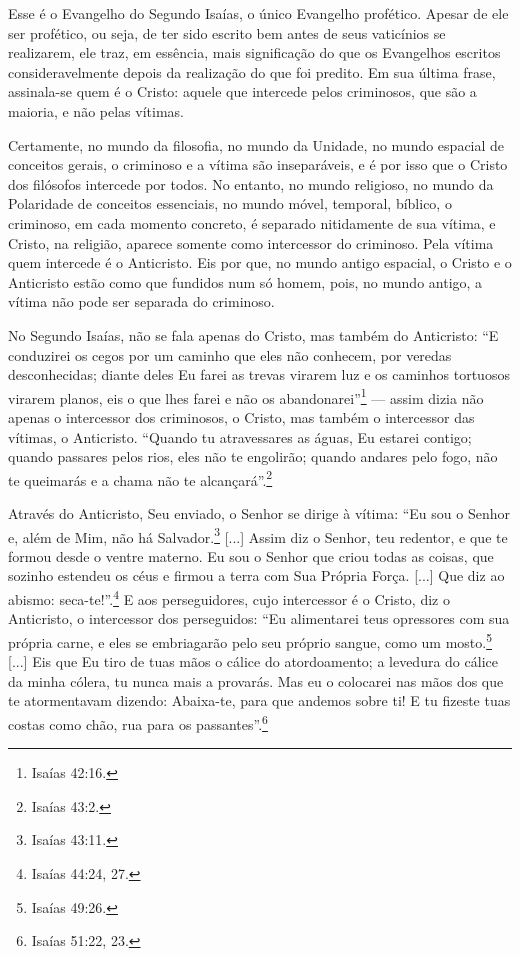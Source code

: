Esse é o Evangelho do Segundo Isaías, o único Evangelho profético.
Apesar de ele ser profético, ou seja, de ter sido escrito bem antes de
seus vaticínios se realizarem, ele traz, em essência, mais significação
do que os Evangelhos escritos consideravelmente depois da realização do
que foi predito. Em sua última frase, assinala-se quem é o Cristo:
aquele que intercede pelos criminosos, que são a maioria, e não pelas
vítimas.

Certamente, no mundo da filosofia, no mundo da Unidade, no mundo
espacial de conceitos gerais, o criminoso e a vítima são inseparáveis, e
é por isso que o Cristo dos filósofos intercede por todos. No entanto,
no mundo religioso, no mundo da Polaridade de conceitos essenciais, no
mundo móvel, temporal, bíblico, o criminoso, em cada momento concreto, é
separado nitidamente de sua vítima, e Cristo, na religião, aparece
somente como intercessor do criminoso. Pela vítima quem intercede é o
Anticristo. Eis por que, no mundo antigo espacial, o Cristo e o
Anticristo estão como que fundidos num só homem, pois, no mundo antigo,
a vítima não pode ser separada do criminoso.

No Segundo Isaías, não se fala apenas do Cristo, mas também do
Anticristo: ``E conduzirei os cegos por um caminho que eles não
conhecem, por veredas desconhecidas; diante deles Eu farei as trevas
virarem luz e os caminhos tortuosos virarem planos, eis o que lhes farei
e não os abandonarei''\footnote{Isaías 42:16.} --- assim dizia não
apenas o intercessor dos criminosos, o Cristo, mas também o intercessor
das vítimas, o Anticristo. ``Quando tu atravessares as águas, Eu estarei
contigo; quando passares pelos rios, eles não te engolirão; quando
andares pelo fogo, não te queimarás e a chama não te
alcançará''.\footnote{Isaías 43:2.}

Através do Anticristo, Seu enviado, o Senhor se dirige à vítima: ``Eu
sou o Senhor e, além de Mim, não há Salvador.\footnote{Isaías 43:11.}
{[}...{]} Assim diz o Senhor, teu redentor, e que te formou desde o
ventre materno. Eu sou o Senhor que criou todas as coisas, que sozinho
estendeu os céus e firmou a terra com Sua Própria Força. {[}...{]} Que
diz ao abismo: seca-te!''.\footnote{Isaías 44:24, 27.} E aos
perseguidores, cujo intercessor é o Cristo, diz o Anticristo, o
intercessor dos perseguidos: ``Eu alimentarei teus opressores com sua
própria carne, e eles se embriagarão pelo seu próprio sangue, como um
mosto.\footnote{Isaías 49:26.} {[}...{]} Eis que Eu tiro de tuas mãos o
cálice do atordoamento; a levedura do cálice da minha cólera, tu nunca
mais a provarás. Mas eu o colocarei nas mãos dos que te atormentavam
dizendo: Abaixa-te, para que andemos sobre ti! E tu fizeste tuas costas
como chão, rua para os passantes''.\footnote{Isaías 51:22, 23.}

